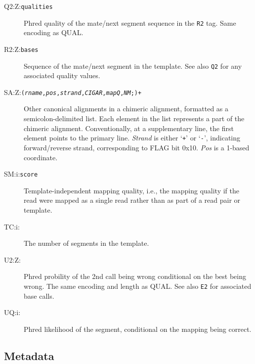 \documentclass[10pt]{article}
\newcommand{\tagvalue}[1]{{\tt #1}}
\newcommand{\tagregex}[1]{{\tt #1}}
\begin{document}
\begin{description}
\item[Q2:Z:\tagvalue{qualities}]
Phred quality of the mate/next segment sequence in the {\tt R2} tag.
Same encoding as {\sf QUAL}.

\item[R2:Z:\tagvalue{bases}]
Sequence of the mate/next segment in the template.  See also {\tt Q2}
for any associated quality values.

\item[SA:Z:\tagregex{{\tt (}\emph{rname}{\tt ,}\emph{pos}{\tt ,}\emph{strand}{\tt ,}\emph{CIGAR}{\tt ,}\emph{mapQ}{\tt ,}\emph{NM}{\tt ;)}+}]
Other canonical alignments in a chimeric alignment, formatted as a semicolon-delimited list.
Each element in the list represents a part of the chimeric alignment. Conventionally, at a supplementary line, the first element points to the primary line.
\emph{Strand} is either `{\tt +}' or `{\tt -}', indicating forward/reverse strand, corresponding to FLAG bit 0x10.
\emph{Pos} is a 1-based coordinate.

\item[SM:i:\tagvalue{score}]
Template-independent mapping quality, i.e., the mapping quality if the read were mapped as a single read rather than as part of a read pair or template.

\item[TC:i:\tagvalue{}]
The number of segments in the template.

\item[U2:Z:\tagvalue{}]
Phred probility of the 2nd call being wrong conditional on the best being wrong.
The same encoding and length as {\sf QUAL}.  See also {\tt E2} for associated base calls.

\item[UQ:i:\tagvalue{}]
Phred likelihood of the segment, conditional on the mapping being correct.
\end{description}

\subsection{Metadata}
\end{document}
